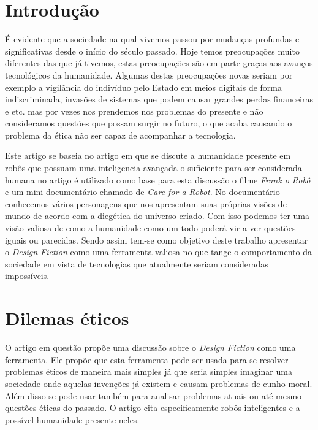 \documentclass[12pt]{article}
\begin{document}
	\section{Introdução}
	\par É evidente que a sociedade na qual vivemos passou por mudanças profundas e significativas desde o início do século passado. Hoje temos preocupações muito diferentes das que já tivemos, estas preocupações são em parte graças aos avanços tecnológicos da humanidade. Algumas destas preocupações novas seriam por exemplo a vigilância do indivíduo pelo Estado em meios digitais de forma indiscriminada, invasões de sistemas que podem causar grandes perdas financeiras e etc. mas por vezes nos prendemos nos problemas do presente e não consideramos questões que possam surgir no futuro, o que acaba causando o problema da ética não ser capaz de acompanhar a tecnologia.
	\par
	Este artigo se baseia no artigo \cite{lindley_operationalising_2016} em que se discute a humanidade presente em robôs que possuam uma inteligencia avançada o suficiente para ser considerada humana no artigo é utilizado como base para esta discussão o filme \textit{Frank o Robô} e um mini documentário chamado de  \textit{Care for a Robot}. No documentário conhecemos vários personagens que nos apresentam suas próprias visões de mundo de acordo com a diegética do universo criado. Com isso podemos ter uma visão valiosa de como a humanidade como um todo poderá vir a ver questões iguais ou parecidas. Sendo assim tem-se como objetivo deste trabalho apresentar o \textit{Design Fiction} como uma ferramenta valiosa no que tange o comportamento da sociedade em vista de tecnologias que atualmente seriam consideradas impossíveis.


	\section{\label{artigo:Dilemas}Dilemas éticos}

	O artigo em questão propõe uma discussão sobre o \textit{Design Fiction} como uma ferramenta. Ele propõe que esta ferramenta pode ser usada para se resolver problemas éticos de maneira mais simples já que seria simples imaginar uma sociedade onde aquelas invenções já existem e causam problemas de cunho moral. Além disso se pode usar também para analisar problemas atuais ou até mesmo questões éticas do passado. O artigo cita especificamente robôs inteligentes e a possível humanidade presente neles. 
\end{document}
